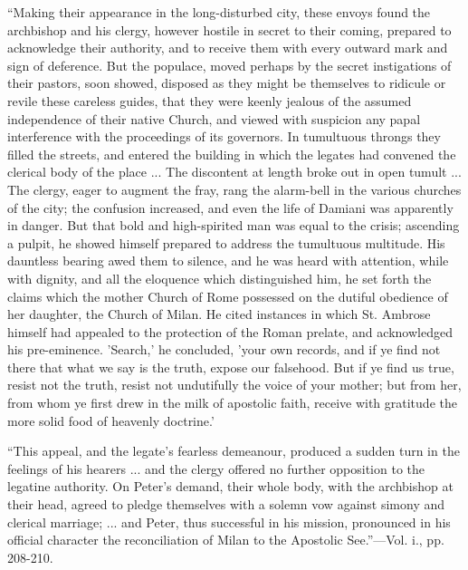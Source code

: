 ``Making
their appearance in the long-disturbed city, these envoys found the
archbishop and his clergy, however hostile in secret to their coming,
prepared to acknowledge their authority, and to receive them with
every outward mark and sign of deference. But the populace, moved
perhaps by the secret instigations of their pastors, soon showed,
disposed as they might be themselves to ridicule or revile these
careless guides, that they were keenly jealous of the assumed
independence of their native Church, and viewed with suspicion any
papal interference with the proceedings of its governors. In
tumultuous throngs they filled the streets, and entered the building
in which the legates had convened the clerical body of the place ...
The discontent at length broke out in open tumult ... The clergy,
eager to augment the fray, rang the alarm-bell in the various churches
of the city; the confusion increased, and even the life of Damiani was
apparently in danger. But that bold and high-spirited
man was equal to the crisis; ascending a pulpit, he showed himself
prepared to address the tumultuous multitude. His dauntless bearing
awed them to silence, and he was heard with attention, while with
dignity, and all the eloquence which distinguished him, he set forth
the claims which the mother Church of Rome possessed on the dutiful
obedience of her daughter, the Church of Milan. He cited instances in
which St. Ambrose himself had appealed to the protection of the Roman
prelate, and acknowledged his pre-eminence. 'Search,' he concluded,
'your own records, and if ye find not there that what we say is the
truth, expose our falsehood. But if ye find us true, resist not the
truth, resist not undutifully the voice of your mother; but from her,
from whom ye first drew in the milk of apostolic faith, receive with
gratitude the more solid food of heavenly doctrine.'

``This
appeal, and the legate's fearless demeanour, produced a sudden turn in
the feelings of his hearers ... and the clergy offered no further
opposition to the legatine authority. On Peter's demand, their whole
body, with the archbishop at their head, agreed to pledge themselves
with a solemn vow against simony and clerical marriage; ... and Peter,
thus successful in his mission, pronounced in his official character
the reconciliation of Milan to the Apostolic See.''—Vol. i., pp.
208-210.

